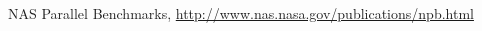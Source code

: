\documentclass[conference,compsoc]{IEEEtran}
\begin{document}




















%
%
%


\begin{thebibliography}{1}

NAS Parallel Benchmarks, \url{http://www.nas.nasa.gov/publications/npb.html}

\end{thebibliography}

\appendix 
\end{document}
